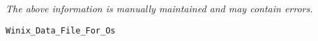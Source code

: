 \label{pkg:data\_file}

{\tiny \it The above information is manually maintained and may contain errors.}
\begin{verbatim}
Winix_Data_File_For_Os
\end{verbatim}
